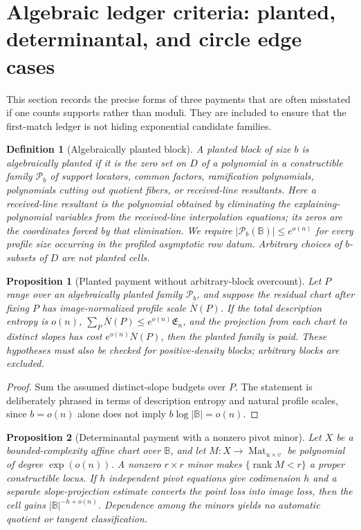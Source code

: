 \documentclass[12pt,a4paper]{amsart}
\numberwithin{equation}{section}
\newtheorem{proposition}[proposition]{Proposition}
\newtheorem{definition}[definition]{Definition}
\theoremstyle{remark}
\DeclareMathOperator{\rank}{rank}
\newcommand{\B}{\mathbb B}
\newcommand{\Pcal}{\mathcal P}
\newcommand{\barN}{\overline N}
\newcommand{\abs}[1]{\lvert #1\rvert}
\begin{document}
\section{Algebraic ledger criteria: planted, determinantal, and circle edge cases}\label{sec:algebraic-repairs}

This section records the precise forms of three payments that are often misstated if one counts supports rather than moduli.  They are included to ensure that the first-match ledger is not hiding exponential candidate families.

\begin{definition}[Algebraically planted block]\label{def:algebraically-planted}
A planted block of size \(b\) is algebraically planted if it is the zero
set on \(D\) of a polynomial in a constructible family \(\Pcal_b\) of
support locators, common factors, ramification polynomials, polynomials
cutting out quotient fibers, or received-line resultants.  Here a
\emph{received-line resultant} is the polynomial obtained by eliminating
the explaining-polynomial variables from the received-line interpolation
equations; its zeros are the coordinates forced by that elimination.  We
require \(\abs{\Pcal_b(\B)}\le e^{o(n)}\) for every profile size occurring
in the profiled asymptotic row datum.  Arbitrary choices of \(b\)-subsets
of \(D\) are not planted cells.
\end{definition}

\begin{proposition}[Planted payment without arbitrary-block overcount]\label{prop:planted-payment-repaired}
Let \(P\) range over an algebraically planted family \(\Pcal_b\), and
suppose the residual chart after fixing \(P\) has image-normalized profile scale
\(\barN(P)\).  If the total description entropy is \(o(n)\),
\(\sum_P\barN(P)\le e^{o(n)}\mathfrak E_n\), and the projection from each
chart to distinct slopes has cost \(e^{o(n)}\barN(P)\), then the planted
family is paid.  These hypotheses must also be checked for positive-density
blocks; arbitrary blocks are excluded.
\end{proposition}

\begin{proof}
Sum the assumed distinct-slope budgets over \(P\).  The statement is
deliberately phrased in terms of description entropy and natural profile
scales, since \(b=o(n)\) alone does not imply
\(b\log\abs\B=o(n)\).
\end{proof}

\begin{proposition}[Determinantal payment with a nonzero pivot minor]\label{prop:determinantal-payment-repaired}
Let \(X\) be a bounded-complexity affine chart over \(\B\), and let
\(M:X\to\operatorname{Mat}_{u\times v}\) be polynomial of degree
\(\exp(o(n))\).  A nonzero \(r\times r\) minor makes
\(\{\rank M<r\}\) a proper constructible locus.  If \(h\) independent
pivot equations give codimension \(h\) and a separate slope-projection
estimate converts the point loss into image loss, then the cell gains
\(\abs\B^{-h+o(n)}\).  Dependence among the minors yields no automatic
quotient or tangent classification.
\end{proposition}
\end{document}

